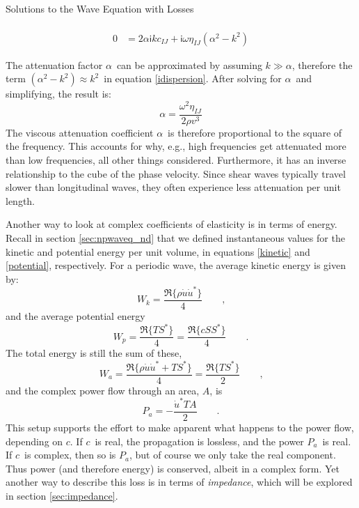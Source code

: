 \documentclass[a4paper,10pt]{report}
\numberwithin{equation}{section}
\begin{document}
{\begin{chapter}
\begin{section}{Solutions to the Wave Equation with Losses}
\begin{singlespace}
\begin{align}
\\
  0 &= 2\alpha\mathsf{i} k c_{IJ} + \mathsf{i}\omega\eta_{IJ}(\alpha^2 - k^2)
 \end{align}
\end{singlespace}
The attenuation factor $\alpha$\  can be approximated by assuming $k \gg \alpha$, therefore the term $(\alpha^2 - k^2) \approx k^2$\  in equation \eqref{idispersion}. After solving for $\alpha$\  and simplifying, the result is\cite[p.~22]{Ballantine1997}:
\begin{equation}
 \alpha = \frac{\omega^2\eta_{IJ}}{2\rho v^3}
\end{equation}
The viscous attenuation coefficient $\alpha$\  is therefore proportional to the square of the frequency. This accounts for why, e.g., high frequencies get attenuated more than low frequencies, all other things considered. Furthermore, it has an inverse relationship to the cube of the phase velocity. Since shear waves typically travel slower than longitudinal waves, they often experience less attenuation per unit length. 
\par
Another way to look at complex coefficients of elasticity is in terms of energy. Recall in section \ref{sec:npwaveq_nd} that we defined instantaneous values for the kinetic and potential energy per unit volume, in equations \eqref{kinetic} and \eqref{potential}, respectively. For a periodic wave, the average kinetic energy is given by\cite[p.~7]{Kino1987}:
\begin{equation}
 W_k = \frac{\Re\{\rho \dot{u} \dot{u}^*\}}{4}\qquad \text{,}
\end{equation}
and the average potential energy
\begin{equation}
W_p = \frac{\Re\{TS^*\}}{4} = \frac{\Re\{cSS^*\}}{4}\qquad \text{.}
\end{equation}
The total energy is still the sum of these, \cite[p.~7]{Kino1987}
\begin{equation}
 W_a = \frac{\Re\{\rho \dot{u} \dot{u}^* + TS^*\}}{4} = \frac{\Re\{TS^*\}}{2} \qquad \text{,}
\end{equation}
and the complex power flow through an area, $A$, is
\begin{equation}
 P_a = -\frac{\dot{u}^*TA}{2} \qquad \text{.}
\end{equation}
This setup supports the effort to make apparent what happens to the power flow, depending on $c$. If $c$\  is real, the propagation is lossless, and the power $P_a$\  is real. If $c$\  is complex, then so is $P_a$, but of course we only take the real component. Thus power (and therefore energy) is conserved, albeit in a complex form.\cite[p.~8]{Kino1987} Yet another way to describe this loss is in terms of \emph{impedance}, which will be explored in section \ref{sec:impedance}. 

\end{section}
\end{chapter}}
\end{document}
